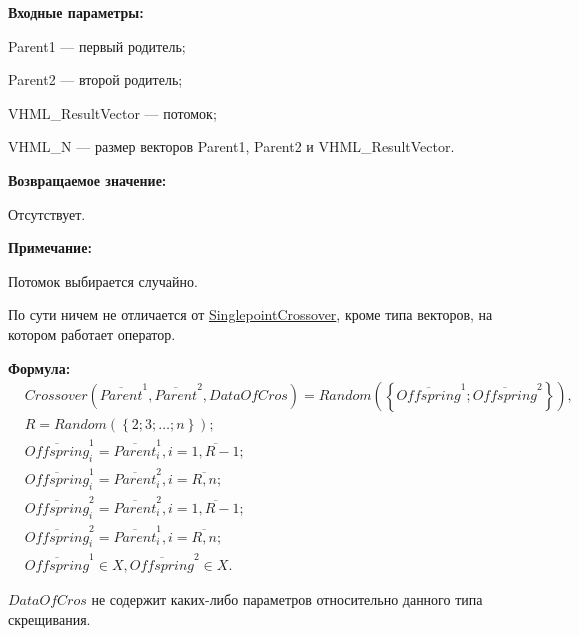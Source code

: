 \textbf{Входные параметры:}
 
Parent1 --- первый родитель;
 
Parent2 --- второй родитель;
 
VHML\_ResultVector --- потомок;
 
VHML\_N --- размер векторов Parent1, Parent2 и VHML\_ResultVector.

\textbf{Возвращаемое значение:}

 Отсутствует.
 
\textbf{ Примечание:}

 Потомок выбирается случайно.
 
По сути ничем не отличается от \hyperref[SetOfOperatorsAlgorithms:SinglepointCrossover]{SinglepointCrossover}, кроме типа векторов, на котором работает оператор.
 
 \textbf{Формула:}
\begin{align}
&Crossover \left( \overline{Parent}^1, \overline{Parent}^2, DataOfCros\right)=Random \left(\left\lbrace \overline{Offspring}^1; \overline{Offspring}^2\right\rbrace  \right), \nonumber\\
&R=Random\left( \left\lbrace 2; 3; \ldots; n\right\rbrace \right); \nonumber \\
& \overline{Offspring}^1_i=\overline{Parent}^1_i, i=\overline{1,R-1};\nonumber\\
&  \overline{Offspring}^1_i=\overline{Parent}^2_i, i=\overline{R,n};\nonumber\\
&\overline{Offspring}^2_i=\overline{Parent}^2_i, i=\overline{1,R-1};\nonumber\\
& \overline{Offspring}^2_i=\overline{Parent}^1_i, i=\overline{R,n};\nonumber\\
&\overline{Offspring}^1\in X, \overline{Offspring}^2\in X.\nonumber
\end{align}

$ DataOfCros $ не содержит каких-либо параметров относительно данного типа скрещивания.